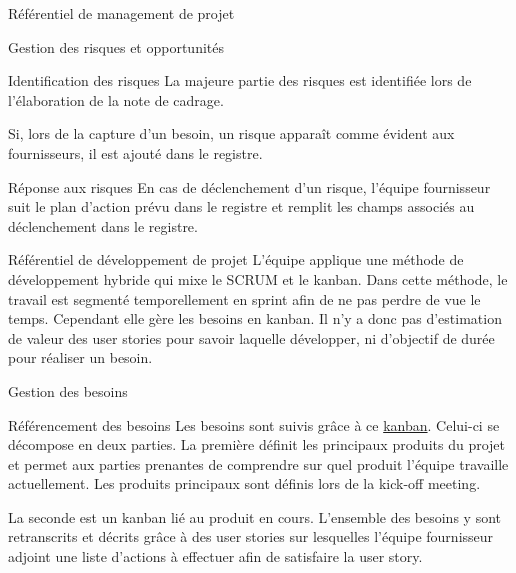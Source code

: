 \documentclass[]{article}
\begin{document}
{\begin{section}{\label{sec:Référentiel de management de projet}Référentiel de management de projet}
\begin{subsection}{\label{sec:Gestion des risques et opportunités}Gestion des risques et opportunités}
         \begin{subsubsection}{\label{sec:Identification des risques}Identification des risques}
             La majeure partie des risques est identifiée lors de l'élaboration de la note de cadrage.

             Si, lors de la capture d'un besoin, un risque apparaît comme évident aux fournisseurs, il est ajouté dans le registre.
         \end{subsubsection}

         \begin{subsubsection}{\label{sec:Réponse au risques}Réponse aux risques}
             En cas de déclenchement d'un risque, l'équipe fournisseur suit le plan d'action prévu dans le registre et remplit les champs associés au déclenchement dans le registre.
         \end{subsubsection}
     \end{subsection}
    \end{section}

\newpage

    \begin{section}{\label{sec:Référentiel de développement de projet}Référentiel de développement de projet}
     L’équipe applique une méthode de développement hybride qui mixe le SCRUM et le kanban. Dans cette méthode, le travail est segmenté temporellement en sprint afin de ne pas perdre de vue le temps. Cependant elle gère les besoins en kanban. Il n’y a donc pas d’estimation de valeur des user stories pour savoir laquelle développer, ni d’objectif de durée pour réaliser un besoin.
     \begin{subsection}{\label{sec:Gestion des besoins}Gestion des besoins}
         \begin{subsubsection}{\label{sec:Référencement des besoins}Référencement des besoins}
             Les besoins sont suivis grâce à ce \href{https://wekan.flopedt.org/b/HsRkBw5rbmQt5PQet/catalogue}{kanban}. Celui-ci se décompose en deux parties. La première définit les principaux produits du projet et permet aux parties prenantes de comprendre sur quel produit l'équipe travaille actuellement. Les produits principaux sont définis lors de la kick-off meeting.

             La seconde est un kanban lié au produit en cours. L'ensemble des besoins y sont retranscrits et décrits grâce à des user stories sur lesquelles l'équipe fournisseur adjoint une liste d'actions à effectuer afin de satisfaire la user story.


\end{subsubsection}
\end{subsection}
\end{section}}
\end{document}
